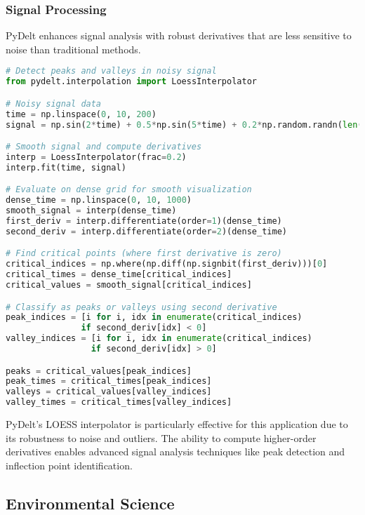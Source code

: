 \documentclass[11pt,a4paper]{article}
\begin{document}
\subsubsection{Signal Processing}

PyDelt enhances signal analysis with robust derivatives that are less sensitive to noise than traditional methods.

\begin{lstlisting}[language=Python, caption=Signal processing example]
# Detect peaks and valleys in noisy signal
from pydelt.interpolation import LoessInterpolator

# Noisy signal data
time = np.linspace(0, 10, 200)
signal = np.sin(2*time) + 0.5*np.sin(5*time) + 0.2*np.random.randn(len(time))

# Smooth signal and compute derivatives
interp = LoessInterpolator(frac=0.2)
interp.fit(time, signal)

# Evaluate on dense grid for smooth visualization
dense_time = np.linspace(0, 10, 1000)
smooth_signal = interp(dense_time)
first_deriv = interp.differentiate(order=1)(dense_time)
second_deriv = interp.differentiate(order=2)(dense_time)

# Find critical points (where first derivative is zero)
critical_indices = np.where(np.diff(np.signbit(first_deriv)))[0]
critical_times = dense_time[critical_indices]
critical_values = smooth_signal[critical_indices]

# Classify as peaks or valleys using second derivative
peak_indices = [i for i, idx in enumerate(critical_indices) 
               if second_deriv[idx] < 0]
valley_indices = [i for i, idx in enumerate(critical_indices) 
                 if second_deriv[idx] > 0]

peaks = critical_values[peak_indices]
peak_times = critical_times[peak_indices]
valleys = critical_values[valley_indices]
valley_times = critical_times[valley_indices]
\end{lstlisting}

PyDelt's LOESS interpolator is particularly effective for this application due to its robustness to noise and outliers. The ability to compute higher-order derivatives enables advanced signal analysis techniques like peak detection and inflection point identification.

\subsection{Environmental Science}
\end{document}
